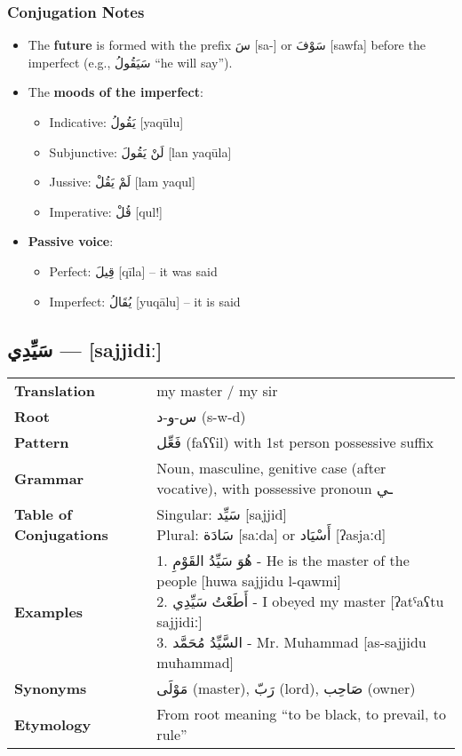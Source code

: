 \documentclass[letterpaper,12pt]{article}
\begin{document}
\subsubsection*{Conjugation Notes}
\begin{itemize}
  \item The \textbf{future} is formed with the prefix \textarabic{سَ} [sa-] or \textarabic{سَوْفَ} [sawfa] before the imperfect (e.g., \textarabic{سَيَقُولُ} “he will say”).
  \item The \textbf{moods of the imperfect}: 
    \begin{itemize}
      \item Indicative: \textarabic{يَقُولُ} [yaqūlu] 
      \item Subjunctive: \textarabic{لَنْ يَقُولَ} [lan yaqūla]
      \item Jussive: \textarabic{لَمْ يَقُلْ} [lam yaqul]
      \item Imperative: \textarabic{قُلْ} [qul!]
    \end{itemize}
  \item \textbf{Passive voice}: 
    \begin{itemize}
      \item Perfect: \textarabic{قِيلَ} [qīla] – it was said
      \item Imperfect: \textarabic{يُقَالُ} [yuqālu] – it is said
    \end{itemize}
\end{itemize}

\subsection{\textarabic{سَيِّدِي} — [sajjidiː]}

\begin{tabular}{p{3cm}p{10cm}}
\toprule
\textbf{Translation} & my master / my sir \\
\textbf{Root} & \textarabic{س-و-د} (s-w-d) \\
\textbf{Pattern} & \textarabic{فَعِّل} (faʕʕil) with 1st person possessive suffix \\
\textbf{Grammar} & Noun, masculine, genitive case (after vocative), with possessive pronoun \textarabic{ـي} \\
\textbf{Table of Conjugations} & \makecell[l]{
Singular: \textarabic{سَيِّد} [sajjid]\\
Plural: \textarabic{سَادَة} [saːda] or \textarabic{أَسْيَاد} [ʔasjaːd]
} \\
\textbf{Examples} & \makecell[l]{\parbox{9.5cm}{
1. \textarabic{هُوَ سَيِّدُ القَوْمِ} - He is the master of the people [huwa sajjidu l-qawmi]\\
2. \textarabic{أَطَعْتُ سَيِّدِي} - I obeyed my master [ʔatˤaʕtu sajjidiː]\\
3. \textarabic{السَّيِّدُ مُحَمَّد} - Mr. Muhammad [as-sajjidu muħammad]
}} \\
\midrule
\textbf{Synonyms} & \textarabic{مَوْلَى} (master), \textarabic{رَبّ} (lord), \textarabic{صَاحِب} (owner) \\
\textbf{Etymology} & From root meaning ``to be black, to prevail, to rule'' \\
\bottomrule
\end{tabular}
\end{document}
